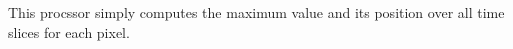 This procssor simply computes the maximum value and its position over
all time slices for each pixel.
